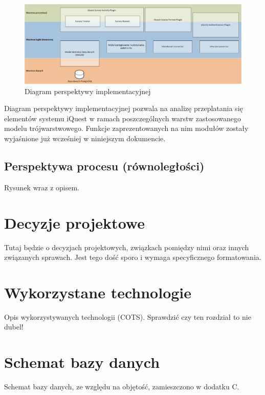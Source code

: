 \begin{figure}[H]
\centering\includegraphics[width=15cm]{figures/Layers}
\caption{Diagram perspektywy implementacyjnej}\label{rys:PerspektywaImplementacyjna}
\end{figure}

Diagram perspektywy implementacyjnej pozwala na analizę przeplatania się elementów systemu iQuest w ramach poszczególnych warstw zastosowanego modelu trójwarstwowego. Funkcje zaprezentowanych na nim modułów zostały wyjaśnione już wcześniej w niniejszym dokumencie.

\subsection{Perspektywa procesu (równoległości)}
\label{Chapter534}

{\color{red}Rysunek wraz z opisem.}

\section{Decyzje projektowe}
\label{Chapter54}

{\color{red}Tutaj będzie o decyzjach projektowych, związkach pomiędzy nimi oraz innych związanych sprawach. Jest tego dość sporo i wymaga specyficznego formatowania.}

\section{Wykorzystane technologie}
\label{Chapter55}

{\color{red}Opis wykorzystywanych technologii (COTS). Sprawdzić czy ten rozdział to nie dubel!}

\section{Schemat bazy danych}
\label{Chapter56}

Schemat bazy danych, ze względu na objętość, zamieszczono w dodatku C.